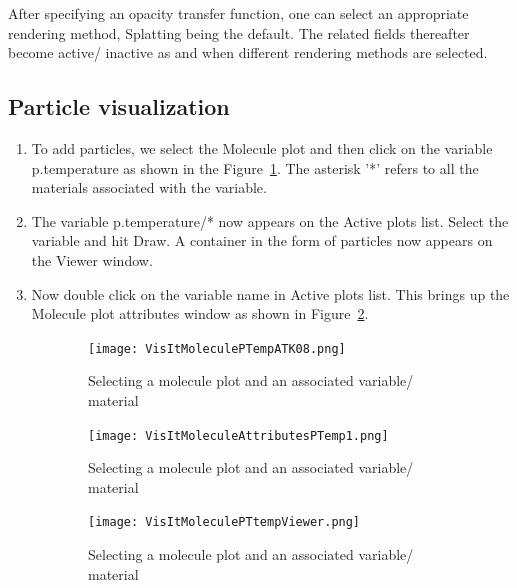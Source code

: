 After specifying an opacity transfer function, one can select an
appropriate rendering method, Splatting being the default. The related
fields thereafter become active/ inactive as and when different
rendering methods are selected.

\subsection{Particle visualization}

\begin{enumerate}

\item To add particles, we select the Molecule plot and then click on
  the variable p.temperature as shown in the
  Figure~\ref{VisItMoleculePTempATK08}. The asterisk '*' refers to all
  the materials associated with the variable.


\item The variable p.temperature/* now appears on the Active plots
  list. Select the variable and hit Draw. A container in the form of
  particles now appears on the Viewer window.

\item Now double click on the variable name in Active plots list. This
  brings up the Molecule plot attributes window as shown in
  Figure~\ref{VisItMoleculeAttributesPTemp1}.

\end{enumerate}


\begin{figure}[htb]
  \centering
  \begin{subfigure}[b]{0.3\textwidth}
    \texttt{[image: VisItMoleculePTempATK08.png]}
    \caption{Selecting a molecule plot and an associated variable/ material}
    \label{VisItMoleculePTempATK08}
  \end{subfigure}
  \begin{subfigure}[b]{0.3\textwidth}
    \texttt{[image: VisItMoleculeAttributesPTemp1.png]}
    \caption{Selecting a molecule plot and an associated variable/ material}
    \label{VisItMoleculeAttributesPTemp1}
  \end{subfigure}
  \begin{subfigure}[b]{0.3\textwidth}
    \texttt{[image: VisItMoleculePTtempViewer.png]}
    \caption{Selecting a molecule plot and an associated variable/ material}
    \label{VisItMoleculePTtempViewer}
  \end{subfigure}
  \caption{}
  \label{ucf.fig6}
\end{figure}

